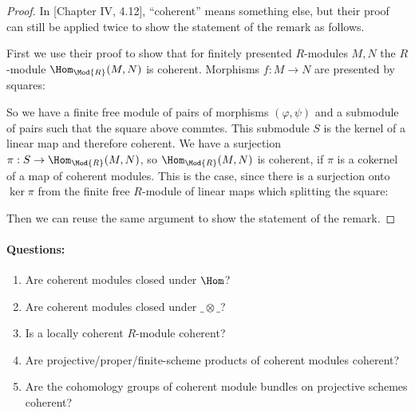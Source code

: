 \begin{proof}
  In \cite{lombardi-quitte}[Chapter IV, 4.12], ``coherent'' means something else, but their proof can still be applied twice to show the statement of the remark as follows.
  
  First we use their proof to show that for finitely presented $R$-modules $M,N$ the $R$-module $\Hom_{\Mod{R}}(M,N)$ is coherent. Morphisms $f:M\to N$ are presented by squares:
  \begin{center}
\end{center}
  So we have a finite free module of pairs of morphisms $(\varphi,\psi)$ and a submodule of pairs such that the square above commtes.
  This submodule $S$ is the kernel of a linear map and therefore coherent.
  We have a surjection $\pi:S\to \Hom_{\Mod{R}}(M,N)$, so $\Hom_{\Mod{R}}(M,N)$ is coherent,
  if $\pi$ is a cokernel of a map of coherent modules.
  This is the case, since there is a surjection onto $\ker{\pi}$ from the finite free $R$-module of linear maps which splitting the square:
  \begin{center}
\end{center}

  Then we can reuse the same argument to show the statement of the remark.
\end{proof}

\paragraph{Questions:}
\begin{enumerate}
\item Are coherent modules closed under $\Hom$?
\item Are coherent modules closed under $\_\otimes\_$?
\item \label{coherent-local} Is a locally coherent $R$-module coherent?
\item Are projective/proper/finite-scheme products of coherent modules coherent?
\item Are the cohomology groups of coherent module bundles on projective schemes coherent?
\end{enumerate}

